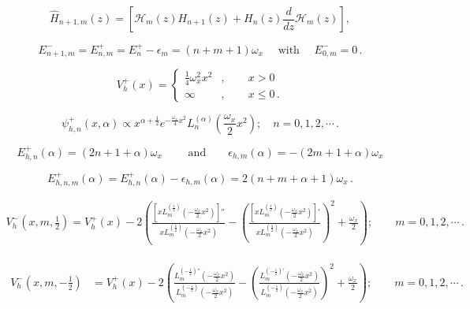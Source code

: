 \documentclass[12pt]{article}
\begin{document}
\begin{equation}
\hat{H}_{n+1,m}(z)=\left[\mathcal{H}_m(z)H_{n+1}(z) + H_{n}(z)\frac{d}{dz}\mathcal{H}_m(z)\right],
\end{equation}

\begin{equation}\label{FLO:E-1D}
E^-_{n+1,m}=E^+_{n,m}=E^+_{n}-\epsilon_m=(n + m + 1)\omega_x \quad 
\text{ with }\quad E^-_{0,m}=0\,.
\end{equation}


\begin{equation}\label{HLO:V+}
    V_h^+(x)=\begin{cases}
        \frac{1}{4}\omega_x^2 x^2 &,\qquad x>0\\
        \infty &,\qquad x\leq 0\,.
    \end{cases}
\end{equation}

\begin{equation}\label{HLO:psi+}
\psi_{h,n}^+(x,\alpha)\propto x^{\alpha +\frac{1}{2}} 
e^{-\frac{\omega_x}{4} x^2} L_n^{(\alpha) }\left(\frac{\omega_x}{2} x^2\right);
\quad n=0,1,2,\cdots\,.
\end{equation} 


\begin{equation}
E^+_{h,n}(\alpha)=(2n+1+\alpha)\omega_x \qquad\text{ and}\qquad 
\epsilon_{h,m}(\alpha)=-(2m+1+\alpha)\omega_x
\end{equation}

\begin{equation}\label{HLO:E+}
E^+_{h,n,m}(\alpha)=E^+_{h,n}(\alpha)-\epsilon_{h,m}(\alpha) = 
2(n+m+\alpha+1)\omega_x\,.
\end{equation}

\begin{align}\label{HLO:V-alpha+}
V_h^-(x, m, \frac{1}{2}) = V_h^+(x) - 2\left( \frac{\left[x L_m^{(\frac{1}{2})}\left(-\frac{\omega_x}{2} x^2\right)\right]''}{x L_m^{(\frac{1}{2})}\left(-\frac{\omega_x}{2} x^2\right)} - \left( \frac{\left[x L_m^{(\frac{1}{2})}\left(-\frac{\omega_x}{2} x^2\right)\right]'}{x L_m^{(\frac{1}{2})}\left(-\frac{\omega_x}{2} x^2\right)} \right)^2 + \frac{\omega_x}{2} \right); \qquad m = 0,1,2,\cdots \,.
\end{align}

\begin{align}
\begin{split}\label{HLO:V-alpha-}
V_h^-(x,m,-\frac{1}{2}) &= V_h^+(x) - 2\left( \frac{L_m^{(-\frac{1}{2})''}
\left(-\frac{\omega_x}{2} x^2\right)}{L_m^{(-\frac{1}{2})}
\left(-\frac{\omega_x}{2} x^2\right)} - \left( \frac{L_m^{(-\frac{1}{2})'}
\left(-\frac{\omega_x}{2} x^2\right)}{L_m^{(-\frac{1}{2})}
\left(-\frac{\omega_x}{2} x^2\right)} \right)^2 + \frac{\omega_x}{2} \right);
\qquad m=0,1,2,\cdots \,.
    \end{split}
\end{align}
\end{document}

